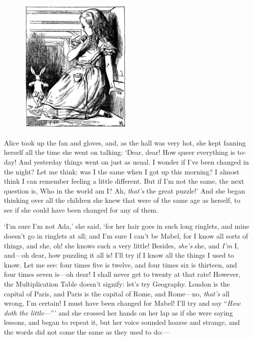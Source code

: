 \documentclass[12pt,openany]{memoir}
\begin{document}
\begin{figure}
  \includegraphics[width=0.5\textwidth]{illustrations/pic_06.jpg}
\end{figure}

Alice took up the fan and gloves, and, as the hall was very hot, she kept fanning herself all the time she went on talking: `Dear, dear! How queer everything is to-day! And yesterday things went on just as usual. I wonder if I've been changed in the night? Let me think: was I the same when I got up this morning? I almost think I can remember feeling a little different. But if I'm not the same, the next question is, Who in the world am I? Ah, \textit{that's} the great puzzle!' And she began thinking over all the children she knew that were of the same age as herself, to see if she could have been changed for any of them.

`I'm sure I'm not Ada,' she said, `for her hair goes in such long ringlets, and mine doesn't go in ringlets at all; and I'm sure I can't be Mabel, for I know all sorts of things, and she, oh! she knows such a very little! Besides, \textit{she's} she, and \textit{I'm} I, and---oh dear, how puzzling it all is! I'll try if I know all the things I used to know. Let me see: four times five is twelve, and four times six is thirteen, and four times seven is---oh dear! I shall never get to twenty at that rate! However, the Multiplication Table doesn't signify: let's try Geography. London is the capital of Paris, and Paris is the capital of Rome, and Rome---no, \textit{that's} all wrong, I'm certain! I must have been changed for Mabel! I'll try and say ``\textit{How doth the little}---''' and she crossed her hands on her lap as if she were saying lessons, and began to repeat it, but her voice sounded hoarse and strange, and the words did not come the same as they used to do:---
\end{document}
